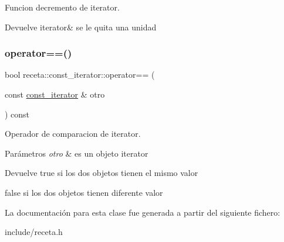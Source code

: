 Funcion decremento de iterator. 

\begin{DoxyReturn}{Devuelve}
iterator\& se le quita una unidad 
\end{DoxyReturn}
\mbox{\label{classreceta_1_1const__iterator_adc1f0fe577017a54ce1d593e80b417fd}} 
\subsubsection{\texorpdfstring{operator==()}{operator==()}}
{\footnotesize\ttfamily bool receta\+::const\+\_\+iterator\+::operator== (\begin{DoxyParamCaption}\item[{const \hyperlink{classreceta_1_1const__iterator}{const\+\_\+iterator} \&}]{otro }\end{DoxyParamCaption}) const}



Operador de comparacion de iterator. 


\begin{DoxyParams}{Parámetros}
{\em otro} & es un objeto iterator \\
\hline
\end{DoxyParams}
\begin{DoxyReturn}{Devuelve}
true si los dos objetos tienen el mismo valor 

false si los dos objetos tienen diferente valor 
\end{DoxyReturn}


La documentación para esta clase fue generada a partir del siguiente fichero\+:\begin{DoxyCompactItemize}
\item 
include/receta.\+h\end{DoxyCompactItemize}
